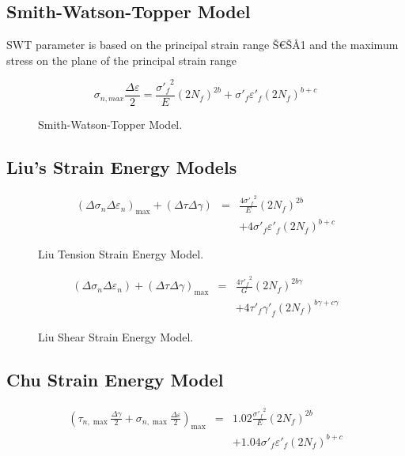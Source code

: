 \documentclass[preprint,5p,twocolumn,11pt,sort&compress]{elsarticle}
\begin{document}
\subsection{Smith-Watson-Topper Model}
SWT parameter is based on the principal strain range Š€ŠÅ1 and the maximum stress on the plane of the principal
strain range

\[{\sigma _{n,max}}\frac{{\Delta \varepsilon }}{2} = \frac{{{{\sigma '}_f}^2}}{E}{\left( {2{N_f}} \right)^{2b}} + {\sigma '_f}{\varepsilon '_f}{\left( {2{N_f}} \right)^{b + c}}\]
\begin{figure}[!htp]
\caption{Smith-Watson-Topper Model.}
\label{Fig:NF-NP-TMF-SWT}
\end{figure}

\subsection{Liu's Strain Energy Models}
\begin{eqnarray*}
{\left( {\Delta {\sigma _n}\Delta {\varepsilon _n}} \right)_{\max }} + \left( {\Delta \tau \Delta \gamma } \right) &=& \frac{{4{{\sigma '}_f}^2}}{E}{\left( {2{N_f}} \right)^{2b}}
\\
& & + 4{{\sigma '}_f}{{\varepsilon '}_f}{\left( {2{N_f}} \right)^{b + c}}
\end{eqnarray*}

\begin{figure}[!htp]
\caption{Liu Tension Strain Energy Model.}
\label{Fig:NF-NP-TMF-Liu}
\end{figure}

\begin{eqnarray*}
\left( {\Delta {\sigma _n}\Delta {\varepsilon _n}} \right) + {\left( {\Delta \tau \Delta \gamma } \right)_{\max }} &=& \frac{{4{{\tau '}_f}^2}}{G}{\left( {2{N_f}} \right)^{2b\gamma }}
\\
&& + 4{{\tau '}_f}{{\gamma '}_f}{\left( {2{N_f}} \right)^{b\gamma  + c\gamma }}
\end{eqnarray*}

\begin{figure}[!htp]
\caption{Liu Shear Strain Energy Model.}
\label{Fig:NF-NP-TMF-Liu2}
\end{figure}

\subsection{Chu Strain Energy Model}
\begin{eqnarray*}
{\left( {{\tau _{n,\max }}\frac{{\Delta \gamma }}{2} + {\sigma _{n,\max }}\frac{{\Delta \varepsilon }}{2}} \right)_{\max }} &=& 1.02\frac{{{{\sigma '}_f}^2}}{E}{\left( {2{N_f}} \right)^{2b}} \\
&& + 1.04{{\sigma '}_f}{{\varepsilon '}_f}{\left( {2{N_f}} \right)^{b + c}}
\end{eqnarray*}
\end{document}
